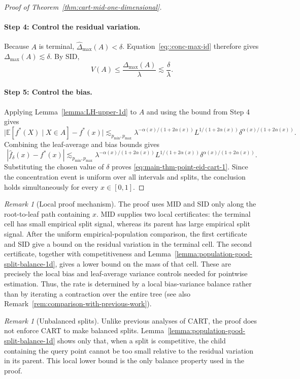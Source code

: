 \documentclass[11pt]{article}
\theoremstyle{plain}
\theoremstyle{definition}
\theoremstyle{remark}
\newtheorem{remark}[theorem]{Remark}
\theoremstyle{plain}
\newcommand{\E}{\mathbb{E}}
\newcommand{\1}{\mathbbm{1}}
\begin{document}
\begin{proof}[Proof of Theorem~\ref{thm:cart-mid-one-dimensional}]
\paragraph{Step 4: Control the residual variation.}
Because $A$ is terminal, $\widehat\Delta_{\max}(A)<\delta$.
Equation~\eqref{eq::conc-max-id} therefore gives
$\Delta_{\max}(A)\lesssim\delta$. By SID,
\[
V(A)\leq \frac{\Delta_{\max}(A)}{\lambda}
\lesssim \frac{\delta}{\lambda}.
\]

\paragraph{Step 5: Control the bias.}
Applying Lemma~\ref{lemma:LH-upper-1d} to $A$ and using the bound from
Step 4 gives
\[
\bigl|\E[f^*(X)\mid X\in A]-f^*(x)\bigr|
\lesssim_{p_{\min},p_{\max}}
\lambda^{-\alpha(x)/(1+2\alpha(x))}
L^{1/(1+2\alpha(x))}
\delta^{\alpha(x)/(1+2\alpha(x))}.
\]
Combining the leaf-average and bias bounds gives
\[
|\hat f_\delta(x)-f^*(x)|
\lesssim_{p_{\min},p_{\max}}
\lambda^{-\alpha(x)/(1+2\alpha(x))}
L^{1/(1+2\alpha(x))}
\delta^{\alpha(x)/(1+2\alpha(x))}.
\]
Substituting the chosen value of $\delta$ proves
\eqref{eq:main-thm-point-eid-cart-1}. Since the concentration event is
uniform over all intervals and splits, the conclusion holds
simultaneously for every $x\in[0,1]$.
\end{proof}

\begin{remark}[Local proof mechanism]
\label{remark:local-proof-mechanism}
The proof uses MID and SID only along the root-to-leaf path containing $x$. MID supplies two local certificates: the terminal cell has small empirical split signal, whereas its parent has large empirical split signal. After the uniform empirical-population comparison, the first certificate and SID give a bound on the residual variation in the terminal cell. The second certificate, together with competitiveness and Lemma~\ref{lemma:population-good-split-balance-1d}, gives a lower bound on the mass of that cell. These are precisely the local bias and leaf-average variance controls needed for pointwise estimation. Thus, the rate is determined by a local bias-variance balance rather than by iterating a contraction over the entire tree (see also Remark~\ref{rem:comparison-with-previous-work}).
\end{remark}

\begin{remark}[Unbalanced splits] \label{remark:unbalanced-splits}
Unlike previous analyses of CART, the proof does not enforce CART to make balanced splits. Lemma~\ref{lemma:population-good-split-balance-1d} shows only that, when a split is competitive, the child containing the query point cannot be too small relative to the residual variation in its parent. This local lower bound is the only balance property used in the proof.
\end{remark}
\end{document}
